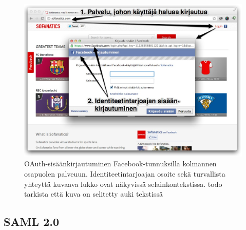 \documentclass[finnish,gradu]{tktltiki}
\begin{document}






  \begin{figure}
    \centering
    \includegraphics[width=1.0\textwidth]{images/facebook_popup_login.jpg}
    \caption{OAuth-sisäänkirjautuminen Facebook-tunnuksilla kolmannen osapuolen palveuun. Identiteetintarjoajan osoite sekä turvallista yhteyttä kuvaava lukko ovat näkyvissä selainkontekstissa. todo tarkista että kuva on selitetty auki tekstissä}
    \label{fig:facebook_oauth_login}
  \end{figure}



  \subsection{SAML 2.0} %
  \label{sub:saml_v2_0}

\end{document}
